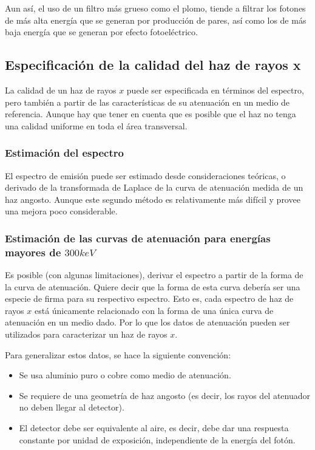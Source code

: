 Aun así, el uso de un filtro más grueso como el plomo, tiende a filtrar los fotones de más alta energía que se generan por producción de pares, así como los de más baja energía que se generan por efecto fotoeléctrico.

\cite{attix2008introduction}

\subsection{Especificación de la calidad del haz de rayos x}

La calidad de un haz de rayos $x$ puede ser especificada en términos del espectro, pero también a partir de las características de su atenuación en un medio de referencia. Aunque hay que tener en cuenta que es posible que el haz no tenga una calidad uniforme en toda el área transversal.

\cite{attix2008introduction}


\subsubsection{Estimación del espectro}

El espectro de emisión puede ser estimado desde consideraciones teóricas, o derivado de la transformada de Laplace de la curva de atenuación medida de un haz angosto. Aunque este segundo método es relativamente más difícil y provee una mejora poco considerable.

\cite{attix2008introduction}

\subsubsection{Estimación de las curvas de atenuación para energías mayores de $300keV$}

Es posible (con algunas limitaciones), derivar el espectro a partir de la forma de la curva de atenuación.
Quiere decir que la forma de esta curva debería ser una especie de firma para su respectivo espectro. Esto es, cada espectro de haz de rayos $x$ está únicamente relacionado con la forma de una única curva de atenuación en un medio dado. Por lo que los datos de atenuación pueden ser utilizados para caracterizar un haz de rayos $x$.

Para generalizar estos datos, se hace la siguiente convención:

\begin{itemize}
    \item Se usa aluminio puro o cobre como medio de atenuación.
    \item Se requiere de una geometría de haz angosto (es decir, los rayos del atenuador no deben llegar al detector).
    \item El detector debe ser equivalente al aire, es decir, debe dar una respuesta constante por unidad de exposición, independiente de la energía del fotón.
\end{itemize}


\cite{attix2008introduction}

\nocite{*}